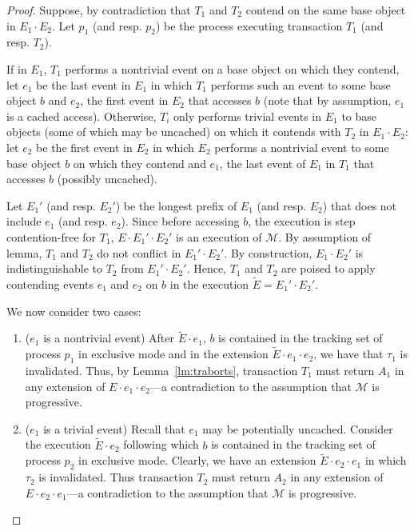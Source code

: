 \begin{proof}
%
Suppose, by contradiction that $T_1$ and $T_2$ 
contend on the same base object in $E_1\cdot E_2$.
Let $p_1$ (and resp. $p_2$) be the process executing transaction $T_1$ (and resp. $T_2$).

If in $E_1$, $T_1$ performs a nontrivial event on a base object on which they contend, let $e_1$ be the last
event in $E_1$ in which $T_1$ performs such an event to some base object $b$ and $e_2$, the first event
in $E_2$ that accesses $b$ (note that by assumption, $e_1$ is a cached access).
Otherwise, $T_i$ only performs trivial events in $E_1$ to base objects (some of which may be uncached) on which it contends with $T_{2}$ in $E_1\cdot E_2$:
let $e_2$ be the first event in $E_2$ in which $E_2$ performs a nontrivial event to some base object $b$
on which they contend and $e_1$, the last event of $E_1$ in $T_1$ that accesses $b$ (possibly uncached).

Let $E_1'$ (and resp. $E_2'$) be the longest prefix of $E_1$ (and resp. $E_2$) that does not include
$e_1$ (and resp. $e_2$).
Since before accessing $b$, the execution is step contention-free for $T_1$, $E \cdot
E_1'\cdot E_2'$ is an execution of $\mathcal{M}$.
By assumption of lemma, $T_1$ and $T_2$ do not conflict in $E_1'\cdot E_2'$.
By construction, $E_1 \cdot E_2'$ is indistinguishable to $T_2$ from $E_1' \cdot E_2'$.
Hence, $T_1$ and $T_{2}$ are poised to apply contending events $e_1$ and $e_2$ on $b$ in the execution
$\tilde E=E_1' \cdot E_2'$.

We now consider two cases:
\begin{enumerate}
\item 
($e_1$ is a nontrivial event)
After $\tilde E\cdot e_1$, $b$ is contained in the tracking set of process
$p_1$ in exclusive mode and in the extension $\tilde E\cdot e_1 \cdot e_2$, we have that
$\tau_1$ is invalidated. Thus, by Lemma~\ref{lm:traborts}, transaction $T_1$ must return $A_1$ 
in any extension of $E\cdot e_1\cdot e_2$---a contradiction
to the assumption that $\mathcal{M}$ is progressive.   
\item
($e_1$ is a trivial event)
Recall that $e_1$ may be potentially uncached.
Consider the execution $\tilde E\cdot e_2$ following which $b$ is contained in the tracking set of process
$p_{2}$ in exclusive mode. Clearly, we have an extension $\tilde E\cdot e_2 \cdot e_1$ in which
$\tau_{2}$ is invalidated. Thus transaction $T_{2}$ must return $A_{2}$ in any extension of $E\cdot e_2\cdot e_1$---a contradiction
to the assumption that $\mathcal{M}$ is progressive.   
\end{enumerate}
\end{proof}
